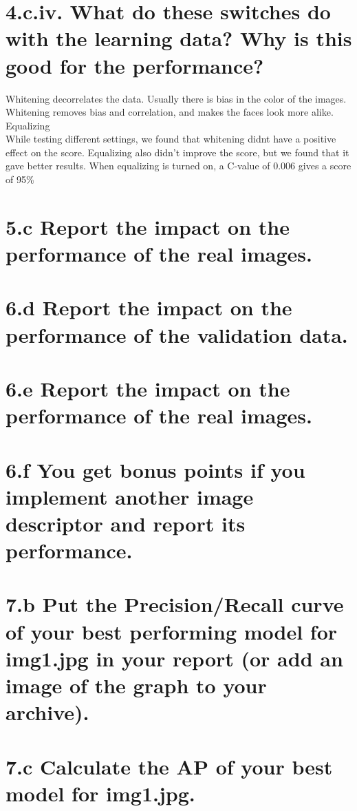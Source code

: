 \documentclass[paper=a4, fontsize=11pt]{scrartcl} %
\numberwithin{equation}{section} %
\numberwithin{figure}{section} %
\numberwithin{table}{section} %
\begin{document}
\section*{4.c.iv. What do these switches do with the learning data? Why is this good for the performance?}
Whitening decorrelates the data. Usually there is bias in the color of the images. Whitening removes bias and correlation, and makes the faces look more alike.\\
Equalizing \\
While testing different settings, we found that whitening didnt have a positive effect on the score. Equalizing also didn't improve the score, but we found that it gave better results. When equalizing is turned on, a C-value of 0.006 gives a score of 95\% \\
\section*{5.c Report the impact on the performance of the real images.}
\section*{6.d Report the impact on the performance of the validation data.}
\section*{6.e Report the impact on the performance of the real images.}
\section*{6.f You get bonus points if you implement another image descriptor and report its performance.}
\section*{7.b Put the Precision/Recall curve of your best performing model for img1.jpg in your report (or add an image of the graph to your archive).}
\section*{7.c Calculate the AP of your best model for img1.jpg.}
\end{document}
